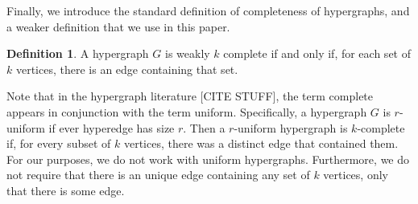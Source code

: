 \documentclass[11pt]{article}
\newcommand{\sanote}{\todo[color=violet!30]}
\newcommand{\sC}{\mathscr{C}}
\newtheorem{lem}[thm]{Lemma}
\theoremstyle{remark}
\theoremstyle{definition}
\newtheorem{dfn}[thm]{Definition}
\begin{document}
\begin{comment}show an that the third circuit, whose existence is demanded by the circuit condition, \eqref{eq:circuitcondition},, must contain the symmetric difference of the two initial circuits.

\begin{lem}\label{res:symdiffcontained}
Let $M = (V, \sC)$. Then, for $x \in C_1 \cap C_2$ and $C_3 \subseteq C_1 \cup C_2 \setminus x$, $C_3$ contains the symmetric difference of $C_1$ and $C_2$: $C_3 \supseteq (C_1 \cup C_2) \setminus (C_1 \cap C_2)$.
\end{lem} \sanote{this is not correct. See strong circuit cond}
\begin{proof}
Suppose that $C_3 \supseteq (C_1 \cup C_2) \setminus (C_1 \cap C_2)$ does not hold. Since $C_3 \subseteq C_1 \cup C_2 \setminus x$, this implies that $C_3 \subsetneq (C_1 \cup C_2) \setminus (C_1 \cap C_2)$. I.e. there is an element $a \in C_2\setminus C_1$ such that $a \not \in C_3$. 

Since $C_3 \not \subseteq C_2$,  $|(C_1 \setminus C_2)\cap C_3| = n_3$ with $y_3 \in C_1 \cap C_3$ Note that $C_2 \not \subseteq C_1 \cap C_3 \setminus y_3$. Therefore, by the circuit condition, \eqref{eq:circuitcondition}, there is a $C_4 \subseteq C_3 \cap C_2 \setminus y_3$. If $n_3 = 1$ then $C_4 \subsetneq C_2$, which is a contradiction.

If $n >1$, $|(C_1 \setminus C_2)\cap C_4|  = n_4 < n_3$. Let $y_4 \in C_3 \cap C_4$, and $C_5 \subseteq C_3 \cap C_4 \setminus y_4$. If $m = i$, then $C_5 \subsetneq C_2$, which is a contradiction. Otherwise, continue applying the circuit condition, \eqref{eq:circuitcondition}, to get $C_{i+1} \subseteq C_3 \cup C_i \setminus y_i$ with $|(C_1 \setminus C_2)\cap C_i|  = n_{i+1} < n_i$. This will yeild $n_k = 1$ for some $k$, forcing $C_{k+1} \subsetneq C_2$ which is a contradiction. 
\end{proof} \end{comment} 
Finally, we introduce the standard definition of completeness of hypergraphs, and a weaker definition that we use in this paper. 
\begin{dfn}\label{dfn:completehypergraph}
	A hypergraph $G$ is weakly $k$ complete if and only if, for each set of $k$ vertices, there is an edge containing that set.
\end{dfn}

Note that in the hypergraph literature [CITE STUFF], the term complete appears in conjunction with the term uniform. Specifically, a hypergraph $G$ is $r$-uniform if ever hyperedge has size $r$. Then a $r$-uniform hypergraph is $k$-complete if, for every subset of $k$ vertices, there was a distinct edge that contained them. For our purposes, we do not work with uniform hypergraphs. Furthermore, we do not require that there is an unique edge containing any set of $k$ vertices, only that there is some edge. 
\end{document}

